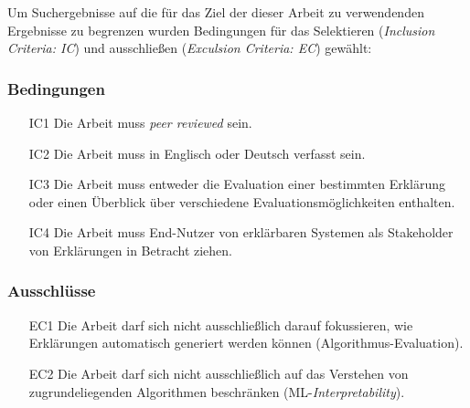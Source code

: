 Um Suchergebnisse auf die für das Ziel der dieser Arbeit zu verwendenden Ergebnisse zu begrenzen wurden Bedingungen für das Selektieren (\textit{Inclusion Criteria: IC}) und ausschließen (\textit{Exculsion Criteria: EC}) gewählt:

\subsubsection{Bedingungen}

\begin{enumerate}
    \item[IC1] Die Arbeit muss \textit{peer reviewed} sein.
    \item[IC2] Die Arbeit muss in Englisch oder Deutsch verfasst sein.
    \item[IC3] Die Arbeit muss entweder die Evaluation einer bestimmten Erklärung oder einen Überblick über verschiedene Evaluationsmöglichkeiten enthalten.
    \item[IC4] Die Arbeit muss End-Nutzer von erklärbaren Systemen als Stakeholder von Erklärungen in Betracht ziehen.
\end{enumerate}

\subsubsection{Ausschlüsse}

\begin{enumerate}
    \item[EC1] Die Arbeit darf sich nicht ausschließlich darauf fokussieren, wie Erklärungen automatisch generiert werden können (Algorithmus-Evaluation).
    \item[EC2] Die Arbeit darf sich nicht ausschließlich auf das Verstehen von zugrundeliegenden Algorithmen beschränken (ML-\textit{Interpretability}).
\end{enumerate}
